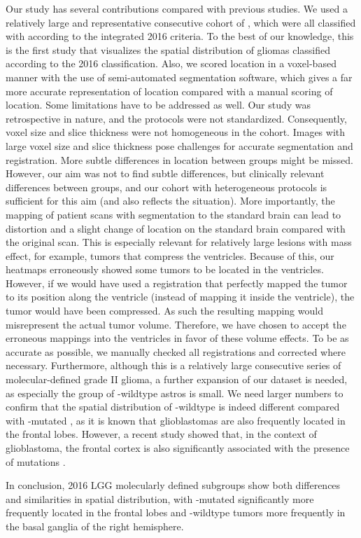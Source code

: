 Our study has several contributions compared with previous studies.
We used a relatively large and representative consecutive cohort of , which were all classified with  according to the integrated  2016 criteria.
To the best of our knowledge, this is the first study that visualizes the spatial distribution of gliomas classified according to the  2016 classification.
Also, we scored location in a voxel-based manner with the use of semi-automated segmentation software, which gives a far more accurate representation of location compared with a manual scoring of location.
Some limitations have to be addressed as well.
Our study was retrospective in nature, and the  protocols were not standardized.
Consequently, voxel size and slice thickness were not homogeneous in the cohort.
Images with large voxel size and slice thickness pose challenges for accurate segmentation and registration.
More subtle differences in location between groups might be missed.
However, our aim was not to find subtle differences, but clinically relevant differences between groups, and our cohort with heterogeneous  protocols is sufficient for this aim (and also reflects the  situation).
More importantly, the mapping of patient  scans with segmentation to the  standard brain can lead to distortion and a slight change of location on the standard brain compared with the original  scan.
This is especially relevant for relatively large lesions with mass effect, for example, \glspl{tumor} that compress the ventricles.
Because of this, our heatmaps erroneously showed some \glspl{tumor} to be located in the ventricles.
However, if we would have used a registration that perfectly mapped the \gls{tumor} to its position along the ventricle (instead of mapping it inside the ventricle), the \gls{tumor} would have been compressed.
As such the resulting mapping would misrepresent the actual \gls{tumor} volume.
Therefore, we have chosen to accept the erroneous mappings into the ventricles in favor of these volume effects.
To be as accurate as possible, we manually checked all registrations and corrected where necessary.
Furthermore, although this is a relatively large consecutive series of molecular-defined grade II glioma, a further expansion of our dataset is needed, as especially the group of -wildtype \glspl{astro} is small.
We need larger numbers to confirm that the spatial distribution of -wildtype  is indeed different compared with -mutated , as it is known that \glspl{glioblastoma} are also frequently located in the frontal lobes.
However, a recent study showed that, in the context of \gls{glioblastoma}, the frontal cortex is also significantly associated with the presence of  mutations \autocite{tejada2018voxel}.

In conclusion,  2016 \gls{LGG} molecularly defined subgroups show both differences and similarities in spatial distribution, with -mutated  significantly more frequently located in the frontal lobes and -wildtype \glspl{tumor} more frequently in the basal ganglia of the right hemisphere.

